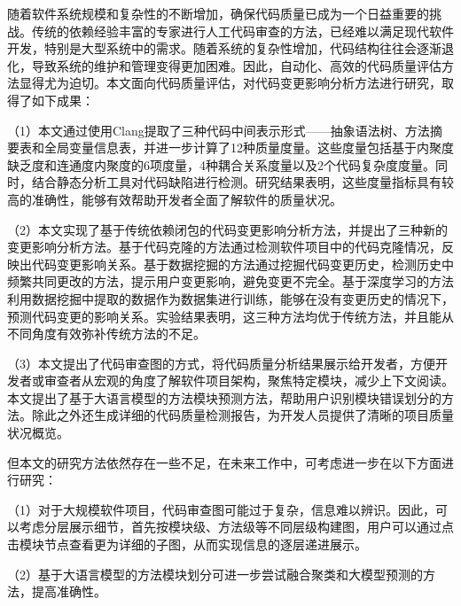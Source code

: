 \begin{conclusions}

随着软件系统规模和复杂性的不断增加，确保代码质量已成为一个日益重要的挑战。传统的依赖经验丰富的专家进行人工代码审查的方法，已经难以满足现代软件开发，特别是大型系统中的需求。随着系统的复杂性增加，代码结构往往会逐渐退化，导致系统的维护和管理变得更加困难。因此，自动化、高效的代码质量评估方法显得尤为迫切。本文面向代码质量评估，对代码变更影响分析方法进行研究，取得了如下成果：

（1）本文通过使用Clang提取了三种代码中间表示形式——抽象语法树、方法摘要表和全局变量信息表，并进一步计算了12种质量度量。这些度量包括基于内聚度缺乏度和连通度内聚度的6项度量，4种耦合关系度量以及2个代码复杂度度量。同时，结合静态分析工具对代码缺陷进行检测。研究结果表明，这些度量指标具有较高的准确性，能够有效帮助开发者全面了解软件的质量状况。

（2）本文实现了基于传统依赖闭包的代码变更影响分析方法，并提出了三种新的变更影响分析方法。基于代码克隆的方法通过检测软件项目中的代码克隆情况，反映出代码变更影响关系。基于数据挖掘的方法通过挖掘代码变更历史，检测历史中频繁共同更改的方法，提示用户变更影响，避免变更不完全。基于深度学习的方法利用数据挖掘中提取的数据作为数据集进行训练，能够在没有变更历史的情况下，预测代码变更的影响关系。实验结果表明，这三种方法均优于传统方法，并且能从不同角度有效弥补传统方法的不足。

（3）本文提出了代码审查图的方式，将代码质量分析结果展示给开发者，方便开发者或审查者从宏观的角度了解软件项目架构，聚焦特定模块，减少上下文阅读。本文提出了基于大语言模型的方法模块预测方法，帮助用户识别模块错误划分的方法。除此之外还生成详细的代码质量检测报告，为开发人员提供了清晰的项目质量状况概览。

但本文的研究方法依然存在一些不足，在未来工作中，可考虑进一步在以下方面进行研究：

（1）对于大规模软件项目，代码审查图可能过于复杂，信息难以辨识。因此，可以考虑分层展示细节，首先按模块级、方法级等不同层级构建图，用户可以通过点击模块节点查看更为详细的子图，从而实现信息的逐层递进展示。

（2）基于大语言模型的方法模块划分可进一步尝试融合聚类和大模型预测的方法，提高准确性。

\end{conclusions}
